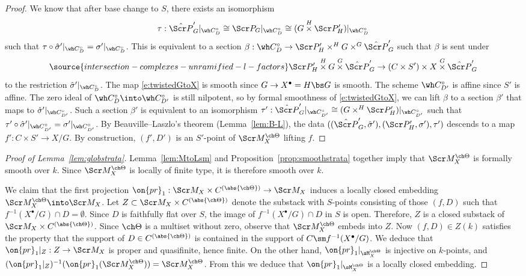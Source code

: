 \begin{proof}
We know that after base change to $S$, there exists an isomorphism
\[ \tau : \hat{\Scr P}'_G|_{\wh C^\circ_D} \cong \Scr P_G|_{\wh C^\circ_D} \cong (G\overset H\times \Scr P'_H)|_{\wh C^\circ_D} \]
such that $\tau \circ \hat\sigma'|_{\wh C^\circ_D} = \sigma'|_{\wh C^\circ_D}$. This is equivalent to a section
$\beta: \wh C^\circ_D \to
\Scr P'_H\times^H G\times^G \hat{\Scr P}'_G$
such that $\beta$ is sent under
\begin{equation} \label{e:twistedGtoX}
\source{intersection-complexes-unramified-l-factors}
    \Scr P'_H \overset H\times G \overset G\times \hat{\Scr P}'_G \to (C\times S')\times X \overset G\times \hat{\Scr P}'_G
\end{equation}
 to the restriction $\hat \sigma'|_{\wh C^\circ_{D}}$.
The map \eqref{e:twistedGtoX} is smooth since $G\to X^\bullet=H\bs G$ is smooth.
The scheme $\wh C^\circ_{D'}$ is affine since $S'$ is affine.
The zero ideal of $\wh C^\circ_D\into \wh C^\circ_{D'}$ is still
nilpotent, so by formal smoothness of \eqref{e:twistedGtoX}, we
can lift $\beta$ to a section $\beta'$ that maps to $\hat \sigma'|_{\wh C^\circ_{D'}}$.
Such a section $\beta'$ is equivalent to an isomorphism
$\tau' : \hat{\Scr P}'_G|_{\wh C^\circ_{D'}} \cong (G\times^H \Scr P'_H)|_{\wh C^\circ_{D'}}$ such that $\tau' \circ \hat\sigma' |_{\wh C^\circ_{D'}} = \sigma'|_{\wh C^\circ_{D'}}$.
By Beauville--Laszlo's theorem (Lemma~\ref{lem:B-L}),
the data $((\hat{\Scr P}'_G,\hat\sigma'), (\Scr P'_H,\sigma'), \tau')$ descends to a map $f' : C\times S' \to X/G$.
By construction, $(f',D')$ is an $S'$-point of $\Scr M^{\ch\Theta}_X$
lifting $f$.
\end{proof}


\begin{proof}[{Proof of Lemma~\ref{lem:globstrata}}]
Lemma~\ref{lem:MtoLsm} and Proposition~\ref{prop:smoothstrata} together
imply that $\Scr M^{\ch\Theta}_X$ is formally smooth over $k$.
Since $\Scr M^{\ch\Theta}_X$ is locally of finite type,
it is therefore smooth over $k$.

We claim that the first projection $\on{pr}_1 : \Scr M_X\times C^{(\abs{\ch\Theta})} \to \Scr M_X$ induces a locally closed
embedding $\Scr M^{\ch\Theta}_X \into \Scr M_X$.
Let $Z \subset \Scr M_X \times C^{(\abs{\ch\Theta})}$ denote the substack
with $S$-points consisting of those $(f,D)$ such that
$f^{-1}(X^\bullet/G)\cap D = \emptyset$.
Since $D$ is faithfully flat over $S$, the image of $f^{-1}(X^\bullet/G)\cap D$ in $S$ is open. Therefore, $Z$
is a closed substack of $\Scr M_X \times C^{(\abs{\ch\Theta})}$.
Since $\ch\Theta$ is a multiset without zero,
observe that $\Scr M^{\ch\Theta}_X$ embeds into
$Z$. Now $(f,D)\in Z(k)$ satisfies the property that the support
of $D\in C^{(\abs{\ch\Theta})}$ is contained in the support of $C \sm f^{-1}(X^\bullet/G)$. We deduce that ${\on{pr}_1}|_Z : Z \to \Scr M_X$ is
proper and quasifinite, hence finite.
On the other hand, $\on{pr}_1|_{\sM^{\ch\Theta}_X}$ is injective
on $k$-points, and
$({\on{pr}_1}|_Z)^{-1}(\on{pr}_1(\Scr M^{\ch\Theta}_X)) = \Scr M^{\ch\Theta}_X$.
From this we deduce that $\on{pr}_1|_{\sM^{\ch\Theta}_X}$
is a locally closed embedding.
\end{proof}




